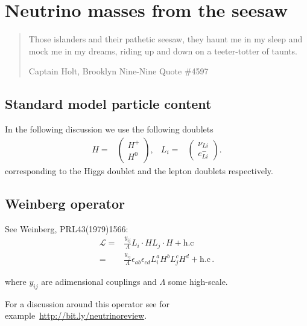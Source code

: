 
\chapter{Neutrino masses from the seesaw}
\begin{quote}
  Those islanders and their pathetic seesaw, they haunt me in my sleep and mock me in my dreams, riding up and down on a teeter-totter of taunts.

  Captain Holt, Brooklyn Nine-Nine Quote \#4597
\end{quote}

\section{Standard model particle content}

\begin{frame}
In the following discussion we use the following doublets
\begin{align}
  H=&
  \begin{pmatrix}
    H^+\\
    H^0
  \end{pmatrix},&
  L_i=&
  \begin{pmatrix}
    \nu_{Li}\\
    e_{Li}^{-}
  \end{pmatrix}.
\end{align}
corresponding to the Higgs doublet and the lepton doublets respectively.
\end{frame}

\section{Weinberg operator}

\begin{frame}
See Weinberg,  PRL43(1979)1566:
 \begin{align*}
   \mathcal{L}
   =&\frac{y_{ij}}{\Lambda} L_i\cdot H L_j\cdot H+\text{h.c}\nonumber\\
   =&\frac{y_{ij}}{\Lambda}\epsilon_{ab}\epsilon_{cd} L^a_i H^b L^c_j H^d+\text{h.c}\,.
 \end{align*}

where $y_{ij}$ are adimensional couplings and $\Lambda$ some high-scale.

For a discussion around this operator see for example~\url{http://bit.ly/neutrinoreview}.
\end{frame}

